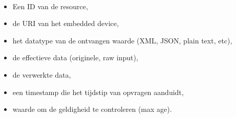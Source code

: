 \paragraph{}
\vspace*{-\parskip}

\begin{itemize}
\item Een ID van de resource,
\item de URI van het embedded device,
\item het datatype van de ontvangen waarde (XML, JSON, plain text, etc),
\item de effectieve data (originele, raw input),
\item de verwerkte data,
\item een timestamp die het tijdstip van opvragen aanduidt,
\item waarde om de geldigheid te controleren (max age).
\end{itemize}

